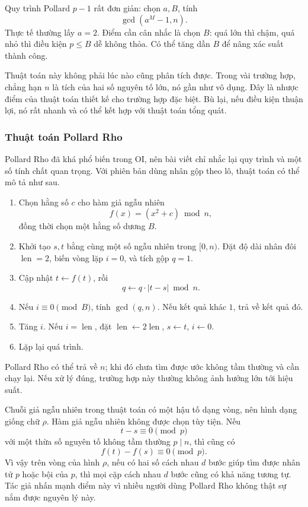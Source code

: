 \documentclass[11pt]{article}
\begin{document}
Quy trình Pollard \(p-1\) rất đơn giản: chọn \(a,B\), tính
\[
  \gcd(a^M-1,n).
\]
Thực tế thường lấy \(a=2\). Điểm cần cân nhắc là chọn \(B\): quá lớn thì chậm,
quá nhỏ thì điều kiện \(p\le B\) dễ không thỏa. Có thể tăng dần \(B\) để nâng
xác suất thành công.

Thuật toán này không phải lúc nào cũng phân tích được. Trong vài trường hợp,
chẳng hạn \(n\) là tích của hai số nguyên tố lớn, nó gần như vô dụng. Đây là
nhược điểm của thuật toán thiết kế cho trường hợp đặc biệt. Bù lại, nếu điều
kiện thuận lợi, nó rất nhanh và có thể kết hợp với thuật toán tổng quát.

\subsubsection{Thuật toán Pollard Rho}

Pollard Rho đã khá phổ biến trong OI, nên bài viết chỉ nhắc lại quy trình và
một số tính chất quan trọng. Với phiên bản dùng nhân gộp theo lô, thuật toán
có thể mô tả như sau.
\begin{enumerate}
  \item Chọn hằng số \(c\) cho hàm giả ngẫu nhiên
  \[
    f(x)=(x^2+c)\bmod n,
  \]
  đồng thời chọn một hằng số dương \(B\).
  \item Khởi tạo \(s,t\) bằng cùng một số ngẫu nhiên trong \([0,n)\). Đặt độ
  dài nhân đôi \(\operatorname{len}=2\), biến vòng lặp \(i=0\), và tích gộp
  \(q=1\).
  \item Cập nhật \(t\gets f(t)\), rồi
  \[
    q\gets q\cdot |t-s|\bmod n.
  \]
  \item Nếu \(i\equiv 0\pmod B\), tính \(\gcd(q,n)\). Nếu kết quả khác \(1\),
  trả về kết quả đó.
  \item Tăng \(i\). Nếu \(i=\operatorname{len}\), đặt
  \(\operatorname{len}\gets 2\operatorname{len}\), \(s\gets t\), \(i\gets 0\).
  \item Lặp lại quá trình.
\end{enumerate}

Pollard Rho có thể trả về \(n\); khi đó chưa tìm được ước không tầm thường và
cần chạy lại. Nếu xử lý đúng, trường hợp này thường không ảnh hưởng lớn tới
hiệu suất.

Chuỗi giả ngẫu nhiên trong thuật toán có một hậu tố dạng vòng, nên hình dạng
giống chữ \(\rho\). Hàm giả ngẫu nhiên không được chọn tùy tiện. Nếu
\[
  t-s\equiv 0\pmod p
\]
với một thừa số nguyên tố không tầm thường \(p\mid n\), thì cũng có
\[
  f(t)-f(s)\equiv 0\pmod p.
\]
Vì vậy trên vòng của hình \(\rho\), nếu có hai số cách nhau \(d\) bước giúp tìm
được nhân tử \(p\) hoặc bội của \(p\), thì mọi cặp cách nhau \(d\) bước cũng có
khả năng tương tự. Tác giả nhấn mạnh điểm này vì nhiều người dùng Pollard Rho
không thật sự nắm được nguyên lý này.
\end{document}
